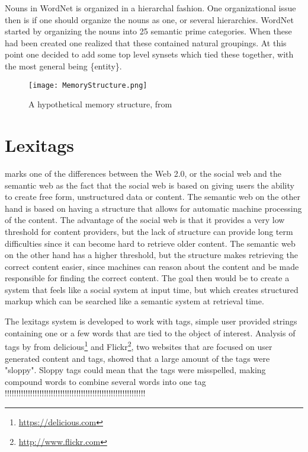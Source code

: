 Nouns in WordNet is organized in a hierarchal fashion. 
One organizational issue then is if one should organize the nouns as one, or several hierarchies.
WordNet started by organizing the nouns into 25 semantic prime categories.
When these had been created one realized that these contained natural groupings.
At this point one decided to add some top level synsets which tied these together, 
with the most general being \{entity\}\citep{Miller1990a}.

\begin{figure}[h]
    \begin{center}
        \texttt{[image: MemoryStructure.png]}
        \caption{A hypothetical memory structure, from \protect \citet{Collins1969}}
        \label{MemoryStructure}
    \end{center}
\end{figure}


\section{Lexitags}
\label{Lexitags}
\citet{Veres2011} marks one of the differences between the Web 2.0, or the social web and the semantic web as the
fact that the social web is based on giving users the ability to create free form, unstructured data or content.
The semantic web on the other hand is based on having a structure that allows for automatic machine processing of the content.
The advantage of the social web is that it provides a very low threshold for content providers, 
but the lack of structure can provide long term difficulties since it can become hard to retrieve older content.
The semantic web on the other hand has a higher threshold, 
but the structure makes retrieving the correct content easier,
since machines can reason about the content and be made responsible for finding the correct content.
The goal then would be to create a system that feels like a social system at input time, 
but which creates structured markup which can be searched like a semantic system at retrieval time.

The lexitags system is developed to work with tags, 
simple user provided strings containing one or a few words that are tied to the object of interest. 
Analysis of tags by \citet{Tonkin2006} from delicious\footnote{\url{https://delicious.com}} and Flickr\footnote{\url{http://www.flickr.com}},
two websites that are focused on user generated content and tags,
showed that a large amount of the tags were "sloppy". 
Sloppy tags could mean that the tags were misspelled, 
making compound words to combine several words into one tag !!!!!!!!!!!!!!!!!!!!!!!!!!!!!!!!!!!!!!!!!!!!!!!!!!!!!!!!!!!!!

